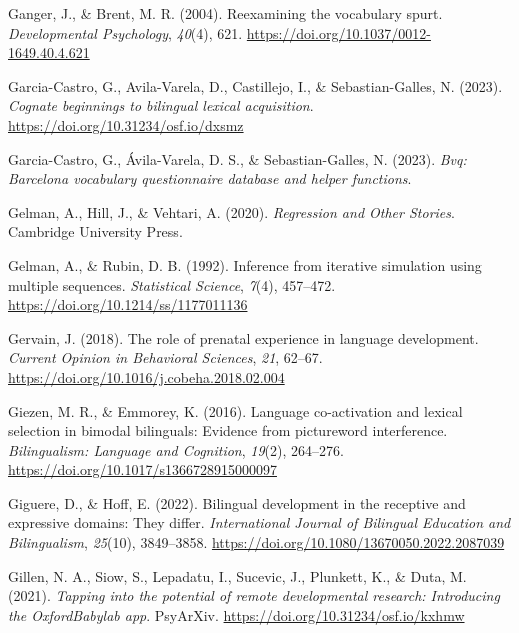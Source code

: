 \documentclass[
  12pt,
  b5paperpaper,
  twoside]{scrreprt}
\newlength{\cslhangindent}
\newlength{\cslentryspacingunit} %
\newenvironment{CSLReferences}[2] %
 {%
  \setlength{\parindent}{0pt}
  \ifodd #1
  \let\oldpar\par
  \def\par{\hangindent=\cslhangindent\oldpar}
  \fi
  \setlength{\parskip}{#2\cslentryspacingunit}
 }%
 {}
\begin{document}
\begin{CSLReferences}{1}{0}
\leavevmode{}%
Ganger, J., \& Brent, M. R. (2004). Reexamining the vocabulary spurt.
\emph{Developmental Psychology}, \emph{40}(4), 621.
\url{https://doi.org/10.1037/0012-1649.40.4.621}

\leavevmode{}%
Garcia-Castro, G., Avila-Varela, D., Castillejo, I., \&
Sebastian-Galles, N. (2023). \emph{Cognate beginnings to bilingual
lexical acquisition}. \url{https://doi.org/10.31234/osf.io/dxsmz}

\leavevmode{}%
Garcia-Castro, G., Ávila-Varela, D. S., \& Sebastian-Galles, N. (2023).
\emph{Bvq: Barcelona vocabulary questionnaire database and helper
functions}.

\leavevmode{}%
Gelman, A., Hill, J., \& Vehtari, A. (2020). \emph{Regression and {Other
Stories}}. {Cambridge University Press}.

\leavevmode{}%
Gelman, A., \& Rubin, D. B. (1992). Inference from iterative simulation
using multiple sequences. \emph{Statistical Science}, \emph{7}(4),
457--472. \url{https://doi.org/10.1214/ss/1177011136}

\leavevmode{}%
Gervain, J. (2018). The role of prenatal experience in language
development. \emph{Current Opinion in Behavioral Sciences}, \emph{21},
62--67. \url{https://doi.org/10.1016/j.cobeha.2018.02.004}

\leavevmode{}%
Giezen, M. R., \& Emmorey, K. (2016). Language co-activation and lexical
selection in bimodal bilinguals: Evidence from picture{\textendash}word
interference. \emph{Bilingualism: Language and Cognition}, \emph{19}(2),
264--276. \url{https://doi.org/10.1017/s1366728915000097}

\leavevmode{}%
Giguere, D., \& Hoff, E. (2022). Bilingual development in the receptive
and expressive domains: They differ. \emph{International Journal of
Bilingual Education and Bilingualism}, \emph{25}(10), 3849--3858.
\url{https://doi.org/10.1080/13670050.2022.2087039}

\leavevmode{}%
Gillen, N. A., Siow, S., Lepadatu, I., Sucevic, J., Plunkett, K., \&
Duta, M. (2021). \emph{Tapping into the potential of remote
developmental research: Introducing the {OxfordBabylab} app}.
{PsyArXiv}. \url{https://doi.org/10.31234/osf.io/kxhmw}


\end{CSLReferences}
\end{document}
